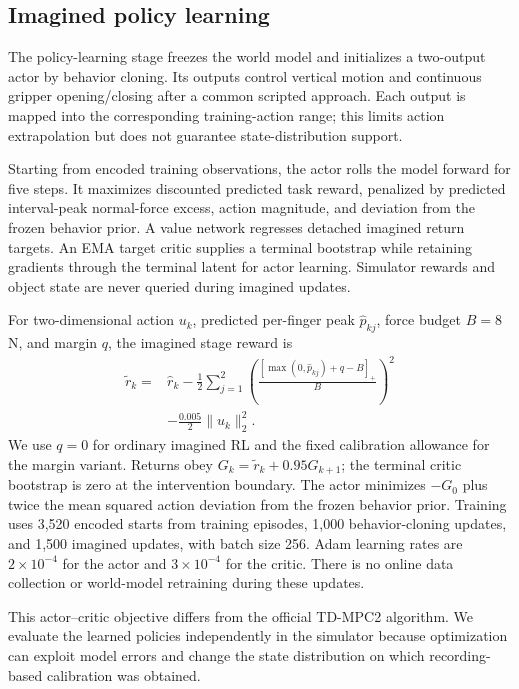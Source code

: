 \documentclass[letterpaper,10pt,conference]{ieeeconf}
\begin{document}
\subsection{Imagined policy learning}
\label{sec:policy}

The policy-learning stage freezes the world model and initializes a
two-output actor by behavior cloning. Its outputs control vertical motion and
continuous gripper opening/closing after a common scripted approach. Each
output is mapped into the corresponding training-action range; this limits
action extrapolation but does not guarantee state-distribution support.

Starting from encoded training observations, the actor rolls the model forward
for five steps. It maximizes discounted predicted task reward, penalized by
predicted interval-peak normal-force excess, action magnitude, and deviation
from the frozen behavior prior. A value network regresses detached imagined
return targets. An EMA target critic supplies a terminal bootstrap while
retaining gradients through the terminal latent for actor learning. Simulator
rewards and object state are never queried during imagined updates.

For two-dimensional action $u_k$, predicted per-finger peak $\widehat p_{kj}$,
force budget $B=8$ N, and margin $q$, the imagined stage reward is
\begin{equation}
\begin{aligned}
\widetilde r_k={}&\widehat r_k-\frac12\sum_{j=1}^2
\left(\frac{[\max(0,\widehat p_{kj})+q-B]_+}{B}\right)^2\\
&-\frac{0.005}{2}\|u_k\|_2^2.
\end{aligned}
\label{eq:imagined-reward}
\end{equation}
We use $q=0$ for ordinary imagined RL and the fixed calibration allowance
for the margin variant. Returns obey $G_k=\widetilde r_k+0.95G_{k+1}$;
the terminal critic bootstrap is zero at the intervention boundary. The actor
minimizes $-G_0$ plus twice the mean squared action deviation from the frozen
behavior prior. Training uses 3,520 encoded starts from training episodes,
1,000 behavior-cloning updates, and 1,500 imagined updates, with batch size
256. Adam learning rates are $2\times10^{-4}$ for the actor and
$3\times10^{-4}$ for the critic. There is no online data collection or
world-model retraining during these updates.

This actor--critic objective differs from the official TD-MPC2 algorithm.
We evaluate the learned policies independently in the simulator because
optimization can exploit model errors and change the state distribution on
which recording-based calibration was obtained.
\end{document}
